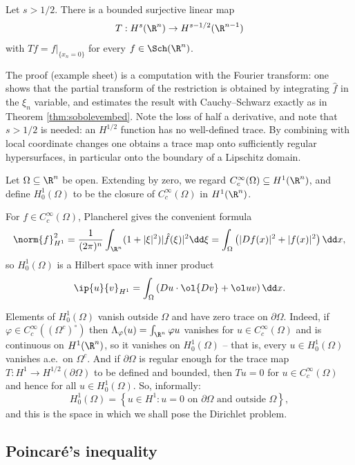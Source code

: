 \begin{theorem}\label{thm:trace}
	Let $s>1/2$. There is a bounded surjective linear map
	$$T : H^s(\R^n)\to H^{s-1/2}(\R^{n-1})$$
	with $Tf = f|_{\{x_n=0\}}$ for every $f \in \Sch(\R^n)$.
\end{theorem}

The proof (example sheet) is a computation with the Fourier transform: one shows that the partial transform of the restriction is obtained by integrating $\hat f$ in the $\xi_n$ variable, and estimates the result with Cauchy--Schwarz exactly as in Theorem \ref{thm:sobolevembed}. Note the loss of half a derivative, and note that $s>1/2$ is needed: an $H^{1/2}$ function has no well-defined trace. By combining with local coordinate changes one obtains a trace map onto sufficiently regular hypersurfaces, in particular onto the boundary of a Lipschitz domain.

\begin{definition}
	Let $\Omega\subseteq\R^n$ be open. Extending by zero, we regard $C_c^\infty(\Omega)\subseteq H^1(\R^n)$, and define $H_0^1(\Omega)$ to be the closure of $C_c^\infty(\Omega)$ in $H^1(\R^n)$.
\end{definition}

For $f\in C_c^\infty(\Omega)$, Plancherel gives the convenient formula
$$\norm{f}_{H^1}^2=\frac{1}{(2\pi)^n}\int_{\R^n}(1+|\xi|^2)|\hat f(\xi)|^2\dd\xi=\int_\Omega\left(|Df(x)|^2+|f(x)|^2\right)\dd x,$$
so $H_0^1(\Omega)$ is a Hilbert space with inner product
$$\ip{u}{v}_{H^1}=\int_\Omega \left(Du\cdot \ol{Dv}+\ol uv\right)\dd x.$$

Elements of $H_0^1(\Omega)$ vanish outside $\Omega$ and have zero trace on $\partial\Omega$. Indeed, if $\varphi\in C_c^\infty((\Omega^c)^\circ)$ then $\Lambda_\varphi(u)=\int_{\R^n}\varphi u$ vanishes for $u \in C_c^\infty(\Omega)$ and is continuous on $H^1(\R^n)$, so it vanishes on $H_0^1(\Omega)$ -- that is, every $u \in H_0^1(\Omega)$ vanishes a.e.\ on $\Omega^c$. And if $\partial\Omega$ is regular enough for the trace map $T : H^1 \to H^{1/2}(\partial\Omega)$ to be defined and bounded, then $Tu = 0$ for $u \in C_c^\infty(\Omega)$ and hence for all $u \in H_0^1(\Omega)$. So, informally:
$$H_0^1(\Omega)=\left\{ u \in H^1 : u = 0 \text{ on } \partial\Omega \text{ and outside }\Omega\right\},$$
and this is the space in which we shall pose the Dirichlet problem.

\subsection{Poincar\'e's inequality}

